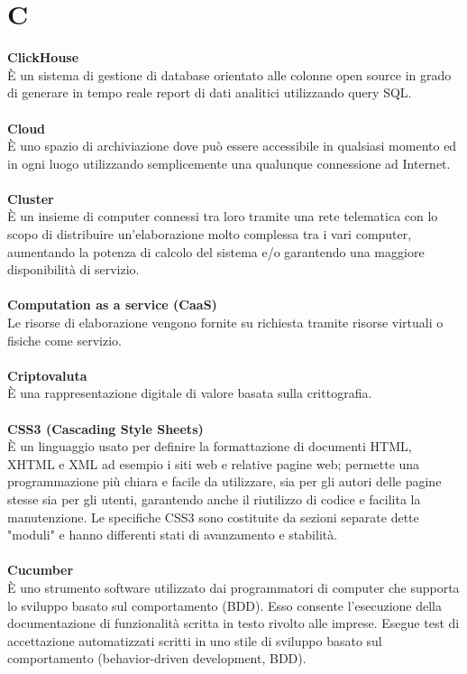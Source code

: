 \section{C}
\textbf{ClickHouse}\\
È un sistema di gestione di database orientato alle colonne open source in grado di generare in tempo reale report di dati analitici utilizzando query SQL. \\ \\
\textbf{Cloud}\\
È uno spazio di archiviazione dove può essere accessibile in qualsiasi momento ed in ogni luogo utilizzando semplicemente una qualunque connessione ad Internet. \\ \\
\textbf{Cluster}\\
È un insieme di computer connessi tra loro tramite una rete telematica con lo scopo di distribuire un'elaborazione molto complessa tra i vari computer, aumentando la potenza di calcolo del sistema e/o garantendo una maggiore disponibilità di servizio. \\ \\
\textbf{Computation as a service (CaaS)}\\
Le risorse di elaborazione vengono fornite su richiesta tramite risorse virtuali o fisiche come servizio. \\ \\
\textbf{Criptovaluta}\\
È una rappresentazione digitale di valore basata sulla crittografia. \\ \\
\textbf{CSS3 (Cascading Style Sheets)}\\
È un linguaggio usato per definire la formattazione di documenti HTML, XHTML e XML ad esempio i siti web e relative pagine web; permette una programmazione più chiara e facile da utilizzare, sia per gli autori delle pagine stesse sia per gli utenti, garantendo anche il riutilizzo di codice e facilita la manutenzione. Le specifiche CSS3 sono costituite da sezioni separate dette "moduli" e hanno differenti stati di avanzamento e stabilità. \\ \\
\textbf{Cucumber}\\
È uno strumento software utilizzato dai programmatori di computer che supporta lo sviluppo basato sul comportamento (BDD). Esso consente l'esecuzione della documentazione di funzionalità scritta in testo rivolto alle imprese. Esegue test di accettazione automatizzati scritti in uno stile di sviluppo basato sul comportamento (behavior-driven development, BDD). \\ \\
\clearpage
